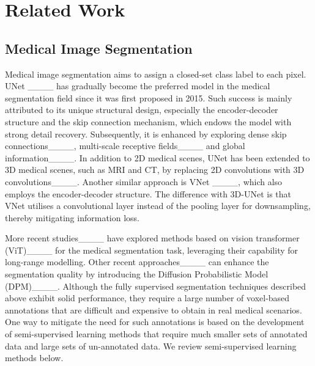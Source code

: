\section{Related Work}
\label{sec:Related Work}

\subsection{Medical Image Segmentation}

Medical image segmentation aims to assign a closed-set class label to each pixel. UNet ____ has gradually become the preferred model in the medical segmentation field since it was first proposed in 2015. Such success is mainly attributed to its unique structural design, especially the encoder-decoder structure and the skip connection mechanism, which endows the model with strong detail recovery. Subsequently, it is enhanced by exploring dense skip connections____, multi-scale receptive fields____ and global information____. 
In addition to 2D medical scenes, UNet has been extended to 3D medical scenes, such as MRI and CT, by replacing 2D convolutions with 3D convolutions____. Another similar approach is VNet ____, which also employs the encoder-decoder structure. The difference with 3D-UNet is that VNet utilises a convolutional layer instead of the pooling layer for downsampling, thereby mitigating information loss. 

More recent studies____ have explored methods based on vision transformer (ViT)____ for the medical segmentation task, leveraging their capability for long-range modelling. Other recent approaches____ can enhance the segmentation quality by introducing the Diffusion Probabilistic Model (DPM)____. 
Although the fully supervised segmentation techniques described above exhibit solid performance, they require a large number of voxel-based annotations that are difficult and expensive to obtain in real medical scenarios. 
One way to mitigate the need for such annotations is based on the development of semi-supervised learning methods that require much smaller sets of annotated data and large sets of un-annotated data. We review semi-supervised learning methods below. 







